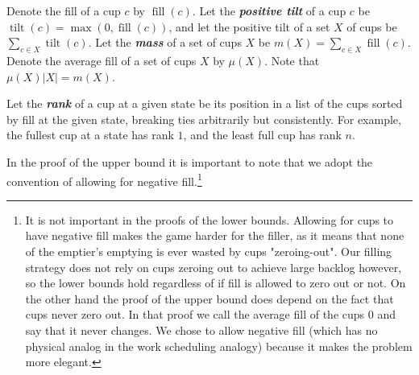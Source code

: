 \documentclass[twocolumn]{article}[11pt]
\newcommand{\defn}[1]{{\textit{\textbf{\boldmath #1}}}}
\DeclareMathOperator{\tilt}{\text{tilt}}
\DeclareMathOperator{\fil}{\text{fill}}
\begin{document}
Denote the fill of a cup $c$ by $\fil(c)$. Let the \defn{positive tilt} of a cup $c$ be
$\tilt(c) = \max(0, \fil(c))$, and let the positive tilt of a set $X$ of
cups be $\sum_{c\in X} \tilt(c)$. Let the \defn{mass} of a set of cups $X$
be $m(X) = \sum_{c\in X} \fil(c)$. Denote the average fill of a set of cups $X$ by 
$\mu(X)$. Note that $\mu(X) |X| = m(X)$.

Let the \defn{rank} of a cup at a given state be its position in a list of the
cups sorted by fill at the given state, breaking ties arbitrarily but
consistently. For example, the fullest cup at a state has rank $1$, and the
least full cup has rank $n$.

In the proof of the upper bound it is important to note that we adopt the
convention of allowing for negative fill.\footnote{It is not important in the
proofs of the lower bounds. Allowing for cups to have negative fill makes the
game harder for the filler, as it means that none of the emptier's emptying is
ever wasted by cups "zeroing-out". Our filling strategy does not rely on cups
zeroing out to achieve large backlog however, so the lower bounds hold
regardless of if fill is allowed to zero out or not. On the other hand the
proof of the upper bound does depend on the fact that cups never zero out. In
that proof we call the average fill of the cups $0$ and say that it never
changes. We chose to allow negative fill (which has no physical analog in the
work scheduling analogy) because it makes the problem more elegant.
}
\end{document}
